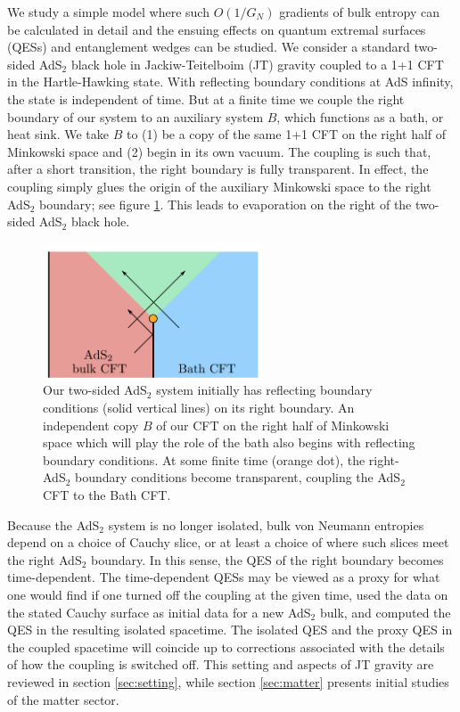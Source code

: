 \documentclass[12pt]{article}
\begin{document}
We study a simple model where such $O(1/G_N)$ gradients of bulk entropy can be calculated in detail
and the ensuing effects on quantum extremal surfaces (QESs) and entanglement wedges can be studied. We consider a standard two-sided AdS$_2$ black hole in Jackiw-Teitelboim (JT) gravity coupled to a 1+1 CFT in the Hartle-Hawking state.  With reflecting boundary conditions at AdS infinity, the state is independent of time.  But at a finite time we couple the right boundary of our system to an auxiliary system $B$, which functions as a bath, or heat sink.  We take $B$ to (1) be a copy of the same 1+1 CFT on the right half of Minkowski space and (2) begin in its own vacuum.  The coupling is such that, after a short transition, the right boundary is fully transparent.  In effect, the coupling simply glues the origin of the auxiliary Minkowski space to the right AdS$_2$ boundary; see figure \ref{fig:coupling}.    This leads to evaporation on the right of the two-sided AdS$_2$ black hole.

\begin{figure}
\begin{center}
\includegraphics[height=4cm]{coupling1.pdf}
\end{center}
\caption{Our two-sided AdS$_2$ system initially has reflecting boundary conditions (solid vertical lines) on its right boundary. An independent copy $B$ of our CFT on the right half of Minkowski space which will play the role of the bath also begins with reflecting boundary conditions. At some finite time (orange dot), the right-AdS$_2$ boundary conditions become transparent, coupling the AdS$_2$ CFT to the Bath CFT.}
\label{fig:coupling}
\end{figure}


Because the AdS$_2$ system is no longer isolated, bulk von Neumann entropies depend on a choice of Cauchy slice, or at least a choice of where such slices meet the right AdS$_2$ boundary.  In this sense, the QES of the right boundary becomes time-dependent. The time-dependent QESs may be viewed as a proxy for what one would find if one turned off the coupling at the given time, used the data on the stated Cauchy surface as initial data for a new AdS$_2$ bulk, and computed the QES in the resulting isolated spacetime.  The isolated QES and the proxy QES in the coupled spacetime will coincide up to corrections associated with the details of how the coupling is switched off.  This setting and aspects of JT gravity are reviewed in section \ref{sec:setting}, while section \ref{sec:matter} presents initial studies of the matter sector.
\end{document}
